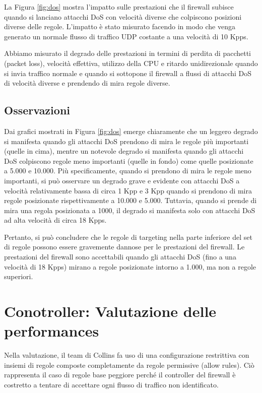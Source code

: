 La Figura \ref{fig:dos} mostra l'impatto sulle prestazioni che il firewall subisce quando si lanciano attacchi DoS con velocità diverse che colpiscono posizioni diverse delle regole. L'impatto è stato misurato facendo in modo che venga generato un normale flusso di traffico UDP costante a una velocità di 10 Kpps.

Abbiamo misurato il degrado delle prestazioni in termini di perdita di pacchetti (packet loss), velocità effettiva, utilizzo della CPU e ritardo unidirezionale quando si invia traffico normale e quando si sottopone il firewall a flussi di attacchi DoS di velocità diverse e prendendo di mira regole diverse.

\subsection{Osservazioni}

Dai grafici mostrati in Figura \ref{fig:dos} emerge chiaramente che un leggero degrado si manifesta quando gli attacchi DoS prendono di mira le regole più importanti (quelle in cima), mentre un notevole degrado si manifesta quando gli attacchi DoS colpiscono regole meno importanti (quelle in fondo) come quelle posizionate a 5.000 e 10.000. Più specificamente, quando si prendono di mira le regole meno importanti, si può osservare un degrado grave e evidente con attacchi DoS a velocità relativamente bassa di circa 1 Kpp e 3 Kpp quando si prendono di mira regole posizionate rispettivamente a 10.000 e 5.000. Tuttavia, quando si prende di mira una regola posizionata a 1000, il degrado si manifesta solo con attacchi DoS ad alta velocità di circa 18 Kpps.

Pertanto, si può concludere che le regole di targeting nella parte inferiore del set di regole possono essere gravemente dannose per le prestazioni del firewall. Le prestazioni del firewall sono accettabili quando gli attacchi DoS (fino a una velocità di 18 Kpps) mirano a regole posizionate intorno a 1.000, ma non a regole superiori.

\section{Conotroller: Valutazione delle performances}

Nella valutazione, il team di Collins fa uso di una configurazione restrittiva con insiemi di regole composte completamente da regole permissive (allow rules). Ciò rappresenta il caso di regole base peggiore perché il controller del firewall è costretto a tentare di accettare ogni flusso di traffico non identificato.

